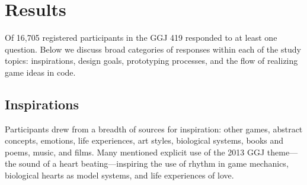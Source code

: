 \documentclass{sig-alternate}
\begin{document}
\section{Results}
Of 16,705 registered participants in the GGJ 419 responded to at least one question.
Below we discuss broad categories of responses within each of the study topics: inspirations, design goals, prototyping processes, and the flow of realizing game ideas in code.



\subsection{Inspirations}
Participants drew from a breadth of sources for inspiration: other games, abstract concepts, emotions, life experiences, art styles, biological systems, books and poems, music, and films. Many mentioned explicit use of the 2013 GGJ theme---the sound of a heart beating---inspiring the use of rhythm in game mechanics, biological hearts as model systems, and life experiences of love.


\end{document}
